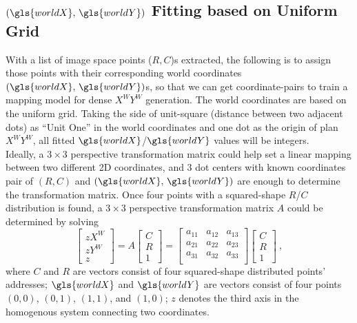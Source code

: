 \subsection{\((\gls{worldX}, \,\gls{worldY})\) Fitting based on Uniform Grid}
\label{uniformGridFittingXY}
With a list of image space points (\(R, C\))s extracted, the following is to assign those points with their corresponding world coordinates \((\gls{worldX}, \,\gls{worldY})\)s, so that we can get coordinate-pairs to train a mapping model for dense \(X^WY^W\) generation. The world coordinates are based on the uniform grid. Taking the side of unit-square (distance between two adjacent dots) as \enquote{Unit One} in the world coordinates and one dot as the origin of plan \(X^WY^W\), all fitted \(\gls{worldX}\)/\(\gls{worldY}\) values will be integers. %
\\\indent%
Ideally, a $3\times3$ perspective transformation matrix could help set a linear mapping between two different 2D coordinates, and 3 dot centers with known coordinates pair of \((R, C)\) and \((\gls{worldX}, \,\gls{worldY})\) are enough to determine the transformation matrix. Once four points with a squared-shape \(R\)/\(C\) distribution is found, a $3\times3$ perspective transformation matrix \(A\) could be determined by solving 
\begin{equation}
%
\left[ \begin{array}{c} %
zX^W \\ zY^W \\ z \end{array} \right] %
= %
A \left[ \begin{array}{c} %
C \\ R \\ 1 \end{array} \right] %
= %
\begin{bmatrix} 
a_{11} & a_{12} & a_{13} \\
a_{21} & a_{22} & a_{23} \\
a_{31} & a_{32} & a_{33} \\
\end{bmatrix}%
 \left[ \begin{array}{c} %
C \\ R \\ 1 \end{array} \right] %
 \ ,%
\label{perspectiveDistortionCorrectionEquation}
\end{equation}%
%
\noindent
where \(C\) and \(R\) are vectors consist of four squared-shape distributed points' addresses; \(\gls{worldX}\) and \(\gls{worldY}\) are vectors consist of four points \((0, 0)\), \((0, 1)\), \((1, 1)\), and \((1, 0)\); \(z\) denotes the third axis in the homogenous system connecting two coordinates. %

